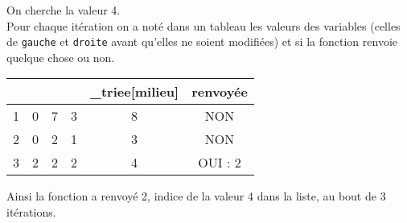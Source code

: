 On cherche la valeur 4.\\

Pour chaque itération on a noté dans un tableau les valeurs des variables (celles de \texttt{gauche} et \texttt{droite} avant qu'elles ne soient modifiées) et si la fonction renvoie quelque chose ou non.

\begin{center}
	\small
	\tabularstyled
	\begin{tabular}{|c|c|c|c|c|c|}
		\hline
		\rowcolor{UGLiOrange}{\thsn° d'itér} & {\thsgauche} & {\thsdroite} & {\thsmilieu} & {\thsliste\_triee[milieu]} & {\thsvaleur renvoyée} \\
		\hline
		1                                                     & 0                             & 7                             & 3                             & 8                                           & NON                                    \\
		\hline
		2                                                     & 0                             & 2                             & 1                             & 3                                           & NON                                    \\
		\hline
		3                                                     & 2                             & 2                             & 2                             & 4                                           & OUI : 2                                \\
		\hline
	\end{tabular}
\end{center}
Ainsi la fonction a renvoyé 2, indice de la valeur 4 dans la liste, au bout de 3 itérations.\\

